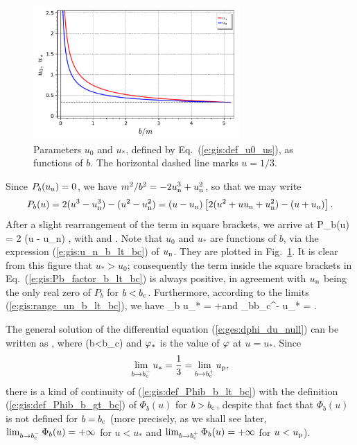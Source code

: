 \begin{figure}
\centerline{\includegraphics[width=0.7\textwidth]{gis_u0_us_b.pdf}}
\caption[]{\label{f:gis:u0_us_b} \footnotesize
Parameters $u_0$ and $u_*$, defined by Eq.~(\ref{e:gis:def_u0_us}), as functions
of $b$. The horizontal dashed line marks $u=1/3$.}
\end{figure}


Since $P_b(u_{\rm n}) = 0$, we have $m^2/b^2 = - 2 u_{\rm n}^3 + u_{\rm n}^2$,
so that we may write
\[
    P_b(u) = 2 (u^3 - u_{\rm n}^3) - (u^2 - u_{\rm n}^2)
        = (u - u_{\rm n}) \left[ 2(u^2 + u u_{\rm n} + u_{\rm n}^2)
            - (u + u_{\rm n}) \right] .
\]
After a slight rearrangement of the term in square brackets, we arrive at
\be \label{e:gis:Pb_factor_b_lt_bc}
    P_b(u) = 2 (u - u_{\rm n}) \left[
        (u - u_0)^2 + (u_* - u_{\rm n})^2 - (u_0 - u_{\rm n})^2 \right] ,
\ee
with
\be \label{e:gis:def_u0_us}
    \qquad\mbox{and}\qquad
   .
\ee
Note that $u_0$ and $u_*$ are functions
of $b$, via the expression (\ref{e:gis:u_n_b_lt_bc}) of $u_{\rm n}$.
They are plotted in Fig.~\ref{f:gis:u0_us_b}. It is clear from this figure
that $u_* > u_0$; consequently the term inside the square brackets in
Eq.~(\ref{e:gis:Pb_factor_b_lt_bc}) is always positive, in agreement with
$u_{\rm n}$ being the only real
zero of $P_b$ for $b < b_{\rm c}$.
Furthermore, according to the limits (\ref{e:gis:range_un_b_lt_bc}), we have
\be
    \lim_{b} u_* = +\infty \qquad\mbox{and}\qquad
    \lim_{b\to b_{\rm c}^-} u_* =  .
\ee

The general solution of the differential equation
(\ref{e:ges:dphi_du_null}) can be written as
\be
   ,
\ee
where
\be \label{e:gis:def_Phib_b_lt_bc}
     \quad (b<b_{\rm c})
\ee
and $\varphi_*$ is the value of $\varphi$ at $u=u_*$. Since
\[
    \lim_{b\to b_{\rm c}^-} u_* = \frac{1}{3} = \lim_{b\to b_{\rm c}^+} u_{\rm p},
\]
there is a kind of continuity of (\ref{e:gis:def_Phib_b_lt_bc})
with the definition (\ref{e:gis:def_Phib_b_gt_bc}) of $\Phi_b(u)$ for
$b>b_{\rm c}$, despite that fact that $\Phi_b(u)$ is not defined
for $b=b_{\rm c}$ (more precisely, as we shall see later,
$\lim_{b\to b_{\rm c}^-} \Phi_b(u) = + \infty$ for $u<u_*$ and
$\lim_{b\to b_{\rm c}^+} \Phi_b(u) = + \infty$ for $u<u_{\rm p}$).

